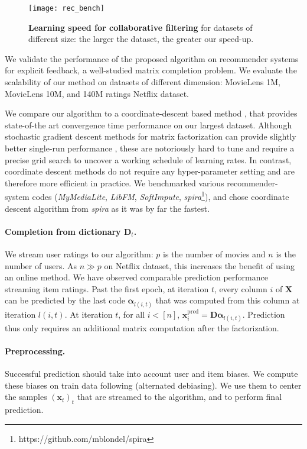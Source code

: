 \documentclass{article}
\def\x{{\mathbf x}}
\def\X{{\mathbf X}}
\def\D{{\mathbf D}}
\def\x{{\mathbf x}}
\newcommand{\balpha}{\boldsymbol{\alpha}}
\begin{document}
\begin{figure*}[ht]
  \centering
  \texttt{[image: rec\_bench]}
  \vspace{-2em}
  \caption{\textbf{Learning speed for collaborative filtering}
for datasets of different size: the larger the dataset, the greater
our speed-up.
  \label{fig:bench_rec}}
\end{figure*}

We validate the performance of the proposed algorithm on recommender systems
for explicit feedback, a well-studied matrix completion problem.
We evaluate the scalability of our method
on datasets of different dimension: MovieLens 1M, MovieLens
10M, and 140M ratings Netflix dataset.

We compare our algorithm to a coordinate-descent based method
\cite{yu_scalable_2012}, that provides state-of-the art convergence time
performance on our largest dataset. Although stochastic gradient descent methods for
matrix factorization can provide slightly better single-run performance \citep{takacs_scalable_2009}, these are notoriously hard
to tune and require a precise grid search to uncover a working
schedule of learning rates. In contrast, coordinate descent methods do not
require any hyper-parameter setting and are therefore more efficient in
practice.
We benchmarked various recommender-system codes
(\textit{MyMediaLite}, \textit{LibFM}, \textit{SoftImpute},
\textit{spira}\footnote{https://github.com/mblondel/spira}), and chose
coordinate descent algorithm from \textit{spira} as it was by far the fastest.


\paragraph{Completion from dictionary $\D_t$.}
We stream user ratings to our algorithm: $p$ is the number of movies and $n$ is
the number of users. As $n \gg p$ on Netflix dataset, this increases
the benefit of using an online method. We have observed comparable prediction
performance streaming item ratings.
Past the first epoch, at iteration $t$, every column $i$ of
$\X$ can be predicted by the last code $\balpha_{l(i, t)}$ that was computed
from this column at iteration $l(i, t)$. At iteration $t$,
for all $i < [n]$, $\x_i^\textrm{pred} = \D\balpha_{l(i, t)}$. Prediction thus only requires an additional matrix computation
 after the factorization.


\paragraph{Preprocessing.} Successful prediction should take into account user
and item biases. We compute these biases on train data following \citet{hastie_matrix_2014} (alternated debiasing). We use them to center the samples $(\x_t)_t$ that are streamed to
 the algorithm, and to perform final prediction.
\end{document}
